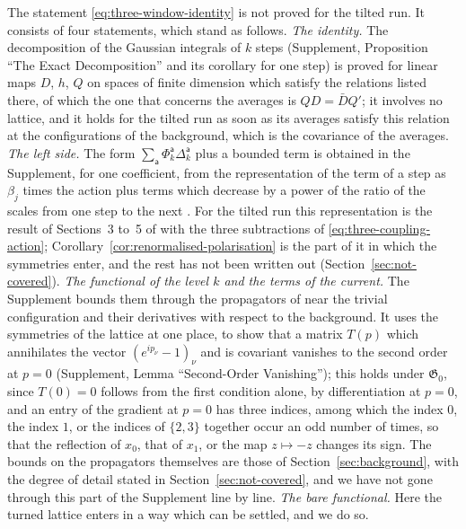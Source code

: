 \documentclass[11pt]{preprint}
\numberwithin{equation}{section}
\theoremstyle{definition}
\theoremstyle{remark}
\theoremstyle{plain}
\begin{document}
The statement \eqref{eq:three-window-identity} is not proved for the tilted run. It consists of four statements, which stand as follows. \emph{The identity.} The decomposition of the Gaussian integrals of $k$ steps (Supplement, Proposition ``The Exact Decomposition'' and its corollary for one step) is proved for linear maps $D$, $h$, $Q$ on spaces of finite dimension which satisfy the relations listed there, of which the one that concerns the averages is $QD = \bar DQ'$; it involves no lattice, and it holds for the tilted run as soon as its averages satisfy this relation at the configurations of the background, which is the covariance of the averages. \emph{The left side.} The form $\sum_{\mathsf a}\Phi^{\mathsf a}_k\Delta^{\mathsf a}_k$ plus a bounded term is obtained in the Supplement, for one coefficient, from the representation of the term of a step as $\beta_j$ times the action plus terms which decrease by a power of the ratio of the scales from one step to the next \cite[(0.28)--(0.30), p.~258]{BalabanRG1}. For the tilted run this representation is the result of Sections~3 to~5 of \cite{BalabanRG1} with the three subtractions of \eqref{eq:three-coupling-action}; Corollary~\ref{cor:renormalised-polarisation} is the part of it in which the symmetries enter, and the rest has not been written out (Section~\ref{sec:not-covered}). \emph{The functional of the level $k$ and the terms of the current.} The Supplement bounds them through the propagators of \cite{BalabanPBG} near the trivial configuration and their derivatives with respect to the background. It uses the symmetries of the lattice at one place, to show that a matrix $T(p)$ which annihilates the vector $(e^{ip_\nu} - 1)_\nu$ and is covariant vanishes to the second order at $p = 0$ (Supplement, Lemma ``Second-Order Vanishing''); this holds under $\mathfrak G_0$, since $T(0) = 0$ follows from the first condition alone, by differentiation at $p = 0$, and an entry of the gradient at $p = 0$ has three indices, among which the index $0$, the index $1$, or the indices of $\{ 2, 3 \}$ together occur an odd number of times, so that the reflection of $x_0$, that of $x_1$, or the map $z \mapsto -z$ changes its sign. The bounds on the propagators themselves are those of Section~\ref{sec:background}, with the degree of detail stated in Section~\ref{sec:not-covered}, and we have not gone through this part of the Supplement line by line. \emph{The bare functional.} Here the turned lattice enters in a way which can be settled, and we do so.
\end{document}
